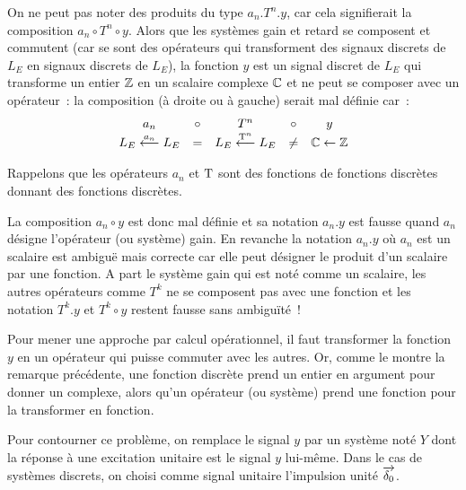 \begin{remarque}
  On ne peut pas noter des produits du type $a_n.T^n.y$, car cela
  signifierait la composition $a_n\circ T^n\circ y$. Alors que les
  systèmes gain et retard se composent et commutent (car se sont des
  opérateurs qui transforment des signaux discrets de $L_E$ en signaux
  discrets de $L_E$), la fonction $y$ est un signal discret de $L_E$
  qui transforme un entier $\mathbb{Z}$ en un scalaire complexe $\mathbb{C}$ et ne
  peut se composer avec un opérateur~: la composition (à droite ou à
  gauche) serait mal définie car~:
  \begin{equation*}
    \begin{array}{ccccc}
      a_n   & \circ &   T^n  & \circ &  y \\
      L_E \overset{a_n}{\longleftarrow} L_E & =  & L_E \overset{\mathrm{T}^n}{\longleftarrow} L_E & \neq  & \mathbb{C} \leftarrow \mathbb{Z} 
    \end{array}
  \end{equation*}

  Rappelons que les opérateurs $a_n$ et $\mathrm{T}$ sont des
  \og{}fonctions de fonctions discrètes donnant des fonctions
  discrètes\fg{}.

  La composition $a_n\circ y$ est donc mal définie et sa notation
  $a_n.y$ est fausse quand $a_n$ désigne l'opérateur (ou système)
  gain. En revanche la notation $a_n.y$ où $a_n$ est un scalaire est
  ambiguë mais correcte car elle peut désigner le produit d'un
  scalaire par une fonction. A part le système gain qui est noté comme
  un scalaire, les autres opérateurs comme $T^k$ ne se composent pas
  avec une fonction et les notation $T^k.y$ et $T^k\circ y$ restent
  fausse sans ambiguïté~!
\end{remarque}



Pour mener une approche par calcul opérationnel, il faut transformer
la fonction $y$ en un opérateur qui puisse commuter avec les autres.
Or, comme le montre la remarque précédente, une fonction discrète prend
un entier en argument pour donner un complexe, alors qu'un opérateur
(ou système) prend une fonction pour la transformer en fonction.

Pour contourner ce problème, on remplace le signal $y$ par un système
noté $Y$ dont la réponse à une excitation unitaire est le signal $y$
lui-même. Dans le cas de systèmes discrets, on choisi comme signal
unitaire l'impulsion unité $\d0$.

